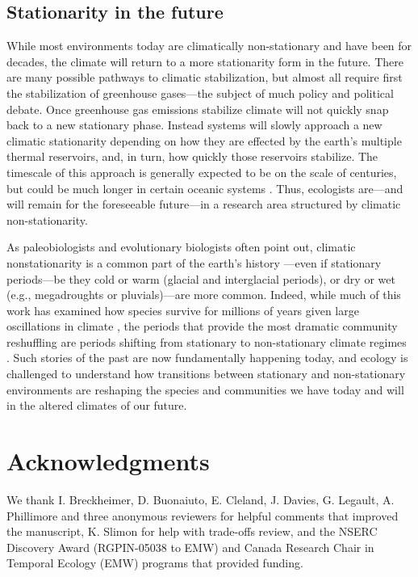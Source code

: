 \documentclass[11pt,letterpaper]{article}
\newcommand{\R}[1]{\label{}\linelabel{#1}} %
\begin{document}
\subsection{Stationarity in the future}
While most environments today are climatically non-stationary and have been for decades, the climate will return to a more stationarity form in the future. There are many possible pathways to climatic stabilization, but almost all require first the stabilization of greenhouse gases---the subject of much policy and political debate. Once greenhouse gas emissions stabilize climate will not quickly snap back to a new stationary phase. Instead systems will slowly approach a new climatic stationarity depending on how they are effected by the earth's multiple thermal reservoirs, and, in turn, how quickly those reservoirs stabilize. The timescale of this approach is generally expected to be on the scale of centuries, but could be much longer in certain oceanic systems \citep{ipcc2013ch12}. Thus, ecologists are---and will remain for the foreseeable future---in a research area structured by climatic non-stationarity. 

As paleobiologists and evolutionary biologists often point out, climatic nonstationarity is a common part of the earth's history \citep{Jansson:2002nz}---even if stationary periods---be they cold or warm (glacial and interglacial periods), or dry or wet (e.g., megadroughts or pluvials)\R{r2precip1}---are more common. Indeed, while much of this work has examined how species survive for millions of years given large oscillations in climate \citep{provan2008}, the periods that provide the most dramatic community reshuffling are periods shifting from stationary to non-stationary climate regimes \citep{vrba1980,vrba1985}. Such stories of the past are now fundamentally happening today, and ecology is challenged to understand how transitions between stationary and non-stationary environments are reshaping the species and communities we have today and will in the altered climates of our future.\R{r2precip2}


\section{Acknowledgments}
We thank I. Breckheimer, D. Buonaiuto, E. Cleland, J. Davies, G. Legault, A. Phillimore and three anonymous reviewers for helpful comments that improved the manuscript, K. Slimon for help with trade-offs review, and the NSERC Discovery Award (RGPIN-05038 to EMW) and Canada Research Chair in Temporal Ecology (EMW) programs that provided funding. 
\end{document}
